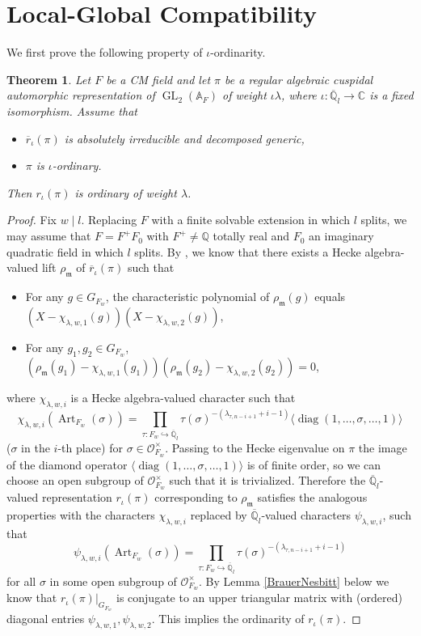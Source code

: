 \documentclass[10pt]{article}
\newtheorem{theorem}{Theorem}[section]
\theoremstyle{definition}
\numberwithin{equation}{theorem}
\newcommand{\AAA}{\mathbb{A}}
\newcommand{\CC}{\mathbb{C}}
\newcommand{\QQ}{\mathbb{Q}}
\newcommand{\calO}{\mathcal{O}}
\newcommand{\gothm}{\mathfrak{m}}
\DeclareMathOperator{\Art}{Art}
\DeclareMathOperator{\diag}{diag}
\DeclareMathOperator{\GL}{GL}
\begin{document}
\section{Local-Global Compatibility}
We first prove the following property of $\iota$-ordinarity.

\begin{theorem}\label{g2.8}
Let $F$ be a CM field and let $\pi$ be a regular algebraic cuspidal automorphic representation of $\GL_2(\AAA_F)$ of weight $\iota\lambda$, where $\iota:\overline{\QQ}_l\to\CC$ is a fixed isomorphism. Assume that 
\begin{itemize}
    \item $\overline{r}_\iota(\pi)$ is absolutely irreducible and decomposed generic,
    \item $\pi$ is $\iota$-ordinary.
\end{itemize}
Then $r_\iota(\pi)$ is ordinary of weight $\lambda$.
\end{theorem}

\begin{proof}
Fix $w\mid l$. Replacing $F$ with a finite solvable extension in which $l$ splits, we may assume that $F=F^+F_0$ with $F^+\ne\QQ$ totally real and $F_0$ an imaginary quadratic field in which $l$ splits. By \cite[Theorem~5.5.1]{ACC+18}, we know that there exists a Hecke algebra-valued lift $\rho_\gothm$ of $\overline{r}_\iota(\pi)$ such that
\begin{itemize}
    \item For any $g\in G_{F_w}$, the characteristic polynomial of $\rho_\gothm(g)$ equals $(X-\chi_{\lambda,w,1}(g))(X-\chi_{\lambda,w,2}(g))$,
    \item For any $g_1, g_2\in G_{F_w}$, $(\rho_\gothm(g_1)-\chi_{\lambda,w,1}(g_1))(\rho_\gothm(g_2)-\chi_{\lambda,w,2}(g_2))=0$,
\end{itemize}
where $\chi_{\lambda,w,i}$ is a Hecke algebra-valued character such that 
$$\chi_{\lambda,w,i}(\Art_{F_w}(\sigma))=\prod_{\tau:F_w\hookrightarrow\overline{\QQ}_l}\tau(\sigma)^{-(\lambda_{\tau,n-i+1}+i-1)}\langle\diag(1,\ldots,\sigma,\ldots,1)\rangle$$
($\sigma$ in the $i$-th place) for $\sigma\in\calO_{F_w}^\times$. Passing to the Hecke eigenvalue on $\pi$ the image of the diamond operator $\langle\diag(1,\ldots,\sigma,\ldots,1)\rangle$ is of finite order, so we can choose an open subgroup of $\calO_{F_w}^\times$ such that it is trivialized. Therefore the $\overline{\QQ}_l$-valued representation $r_\iota(\pi)$ corresponding to $\rho_{\gothm}$ satisfies the analogous properties with the characters $\chi_{\lambda,w,i}$ replaced by $\overline{\QQ}_l$-valued characters $\psi_{\lambda,w,i}$, such that
$$\psi_{\lambda,w,i}(\Art_{F_w}(\sigma))=\prod_{\tau:F_w\hookrightarrow\overline{\QQ}_l}\tau(\sigma)^{-(\lambda_{\tau,n-i+1}+i-1)}$$ for all $\sigma$ in some open subgroup of $\calO_{F_w}^\times$.
By Lemma \ref{BrauerNesbitt} below we know that $r_\iota(\pi)|_{G_{F_w}}$ is conjugate to an upper triangular matrix with (ordered) diagonal entries $\psi_{\lambda,w,1},\psi_{\lambda,w,2}$. This implies the ordinarity of $r_\iota(\pi)$.
\end{proof}
\end{document}
